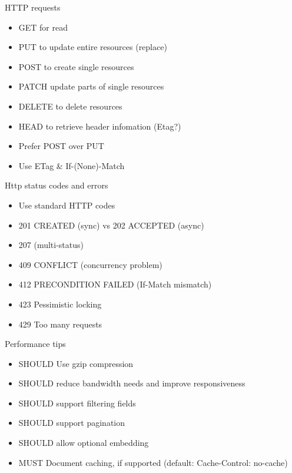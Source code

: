 \documentclass[10pt]{beamer}
\begin{document}
\begin{frame}{HTTP requests}
  \begin{itemize}
    \item GET for read
    \item PUT to update entire resources (replace)
    \item POST to create single resources
    \item PATCH update parts of single resources
    \item DELETE to delete resources
    \item HEAD to retrieve header infomation (Etag?)
    \item Prefer POST over PUT
    \item Use ETag \& If-(None)-Match
  \end{itemize}
\end{frame}

\begin{frame}{Http status codes and errors}

  \begin{itemize}

    \item
          Use standard HTTP codes
    \item
          201 CREATED (sync) vs 202 ACCEPTED (async)
    \item
          207 (multi-status)
    \item
          409 CONFLICT (concurrency problem)
    \item
          412 PRECONDITION FAILED (If-Match mismatch)
    \item
          423 Pessimistic locking
    \item
          429 Too many requests
  \end{itemize}

\end{frame}

\begin{frame}{Performance tips}

  \begin{itemize}

    \item
          SHOULD Use gzip compression
    \item
          SHOULD reduce bandwidth needs and improve responsiveness
    \item
          SHOULD support filtering fields
    \item
          SHOULD support pagination
    \item
          SHOULD allow optional embedding
    \item
          MUST Document caching, if supported (default: Cache-Control: no-cache)
  \end{itemize}

\end{frame}
\end{document}
